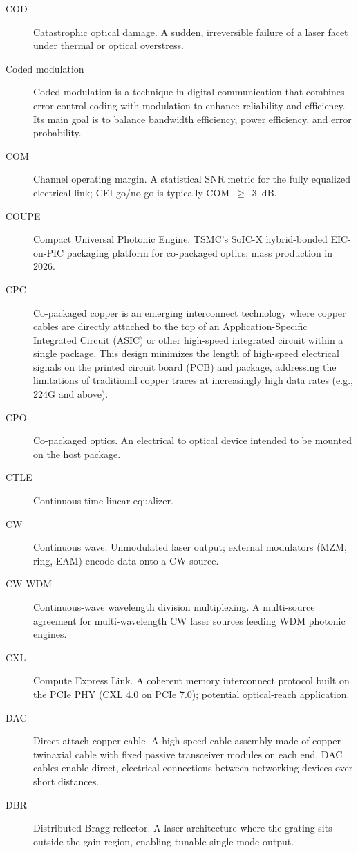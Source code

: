 \begin{description}
\item[COD] Catastrophic optical damage. A sudden, irreversible failure of a laser facet under thermal or optical overstress.
\item[Coded modulation] Coded modulation is a technique in digital communication that combines error-control coding with modulation to enhance reliability and efficiency. Its main goal is to balance bandwidth efficiency, power efficiency, and error probability.
\item[COM] Channel operating margin. A statistical SNR metric for the fully equalized electrical link; CEI go/no-go is typically COM~$\ge$~3~dB.
\item[COUPE] Compact Universal Photonic Engine. TSMC's SoIC-X hybrid-bonded EIC-on-PIC packaging platform for co-packaged optics; mass production in 2026.
\item[CPC] Co-packaged copper is an emerging interconnect technology where copper cables are directly attached to the top of an Application-Specific Integrated Circuit (ASIC) or other high-speed integrated circuit within a single package. This design minimizes the length of high-speed electrical signals on the printed circuit board (PCB) and package, addressing the limitations of traditional copper traces at increasingly high data rates (e.g., 224G and above).
\item[CPO] Co-packaged optics. An electrical to optical device intended to be mounted on the host package.
\item[CTLE] Continuous time linear equalizer.
\item[CW] Continuous wave. Unmodulated laser output; external modulators (MZM, ring, EAM) encode data onto a CW source.
\item[CW-WDM] Continuous-wave wavelength division multiplexing. A multi-source agreement for multi-wavelength CW laser sources feeding WDM photonic engines.
\item[CXL] Compute Express Link. A coherent memory interconnect protocol built on the PCIe PHY (CXL 4.0 on PCIe 7.0); potential optical-reach application.
\item[DAC] Direct attach copper cable. A high-speed cable assembly made of copper twinaxial cable with fixed passive transceiver modules on each end. DAC cables enable direct, electrical connections between networking devices over short distances.
\item[DBR] Distributed Bragg reflector. A laser architecture where the grating sits outside the gain region, enabling tunable single-mode output.

\end{description}
